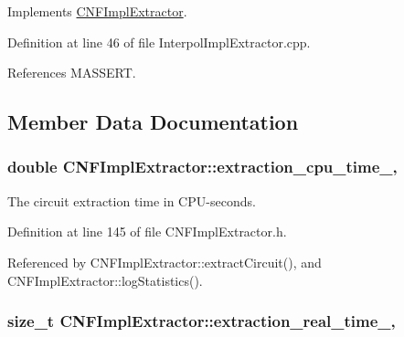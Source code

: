 Implements \hyperlink{classCNFImplExtractor_a8251ce58869f9f8ded159f1fa07ab334}{C\-N\-F\-Impl\-Extractor}.



Definition at line 46 of file Interpol\-Impl\-Extractor.\-cpp.



References M\-A\-S\-S\-E\-R\-T.



\subsection{Member Data Documentation}
\hypertarget{classCNFImplExtractor_ab8be06d42fd3c4b569ec22cfcf2f508e}{
\subsubsection[{extraction\-\_\-cpu\-\_\-time\-\_\-}]{\setlength{\rightskip}{0pt plus 5cm}double C\-N\-F\-Impl\-Extractor\-::extraction\-\_\-cpu\-\_\-time\-\_\-\hspace{0.3cm}{\ttfamily [protected]}, {\ttfamily [inherited]}}}\label{classCNFImplExtractor_ab8be06d42fd3c4b569ec22cfcf2f508e}


The circuit extraction time in C\-P\-U-\/seconds. 



Definition at line 145 of file C\-N\-F\-Impl\-Extractor.\-h.



Referenced by C\-N\-F\-Impl\-Extractor\-::extract\-Circuit(), and C\-N\-F\-Impl\-Extractor\-::log\-Statistics().

\hypertarget{classCNFImplExtractor_ae06413cf08f868357d64545b3041aa18}{
\subsubsection[{extraction\-\_\-real\-\_\-time\-\_\-}]{\setlength{\rightskip}{0pt plus 5cm}size\-\_\-t C\-N\-F\-Impl\-Extractor\-::extraction\-\_\-real\-\_\-time\-\_\-\hspace{0.3cm}{\ttfamily [protected]}, {\ttfamily [inherited]}}}\label{classCNFImplExtractor_ae06413cf08f868357d64545b3041aa18}


